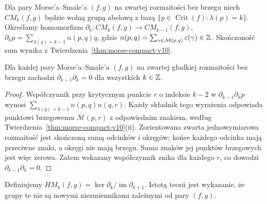 \begin{definicja}
\label{def:morse-complex-v10}
Dla pary Morse'a--Smale'a $(f,g)$ na zwartej rozmaitości bez brzegu
niech $CM_k(f,g)$ będzie wolną grupą abelową z bazą
$\{p\in\operatorname{Crit}(f):\lambda(p)=k\}$.
Określamy homomorfizm $\partial_k:CM_k(f,g)\to CM_{k-1}(f,g)$,
$\partial_kp=\sum_{\lambda(q)=k-1}n(p,q)q$, gdzie
$n(p,q)=\sum_{\gamma\in\mathcal M(p,q)}\varepsilon(\gamma)\in\mathbb{Z}$.
Skończoność sum wynika z Twierdzenia~\ref{thm:morse-compact-v10}.
\end{definicja}

\begin{twierdzenie}[Różniczka Morse'a spełnia $\partial^2=0$]
\label{thm:morse-d2-v10}
Dla każdej pary Morse'a--Smale'a $(f,g)$ na zwartej gładkiej
rozmaitości bez brzegu zachodzi $\partial_{k-1}\partial_k=0$
dla wszystkich $k\in\mathbb{Z}$.
\end{twierdzenie}
\begin{proof}
Współczynnik przy krytycznym punkcie $r$ o indeksie $k-2$
w $\partial_{k-1}\partial_kp$ wynosi
$\sum_{\lambda(q)=k-1}n(p,q)n(q,r)$.
Każdy składnik tego wyrażenia odpowiada punktowi brzegowemu
$\overline{\mathcal M}(p,r)$ z odpowiednim znakiem, według
Twierdzenia~\ref{thm:morse-compact-v10}(ii). Zorientowana
zwarta jednowymiarowa rozmaitość jest skończoną sumą odcinków
i okręgów; końce każdego odcinka mają przeciwne znaki,
a okręgi nie mają brzegu. Suma znaków jej punktów brzegowych
jest więc zerowa. Zatem wskazany współczynnik znika dla
każdego $r$, co dowodzi $\partial_{k-1}\partial_k=0$.
\end{proof}

Definiujemy $HM_k(f,g)=\ker\partial_k/\operatorname{im}\partial_{k+1}$.
Istotą teorii jest wykazanie, że grupy te nie są nowymi
niezmiennikami zależnymi od pary $(f,g)$.

